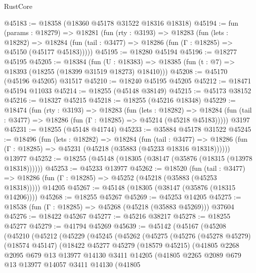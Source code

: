 \begin{lexlean}{RustCore}
\begin{coremodule}
@45183 := @18358 (@18360 @45178 @31522 @18316 @18318)
@45194 := fun (params : @18279) =>
  @18281
    (fun (rty : @3193) =>
    @18283
      (fun (lets : @18282) =>
      @18284 (fun (tail : @3477) => @18286 (fun (Γ : @18285) => @45150 (@45177 @45183)))))
@45195 := @18280 @45194
@45196 := @18277 @45195
@45205 := @18384
    (fun (U : @18383) => @18385 (fun (t : @7) => @18393 (@18255 (@18399 @31519 @18273) @18410)))
@45208 := @45170 (@45196 @45205) @31517
@45210 := @18240 @45195 @45205
@45212 := @18471 @45194 @11033
@45214 := @18255 (@45148 @38149)
@45215 := @45173 @38152
@45216 := @18327 @45215
@45218 := @18255 (@45216 @18348)
@45229 := @18474
    (fun (rty : @3193) =>
    @18283
      (fun (lets : @18282) =>
      @18284 (fun (tail : @3477) => @18286 (fun (Γ : @18285) => @45214 (@45218 @45183)))))
    @3197
@45231 := @18255 (@45148 @41744)
@45233 := @35884 @45178 @31522
@45245 := @18496
    (fun (lets : @18282) =>
    @18284
      (fun (tail : @3477) =>
      @18286 (fun (Γ : @18285) => @45231 (@45218 (@35883 (@45233 @18316 @18318))))))
    @13977
@45252 := @18255 (@45148 (@18305 (@38147 (@35876 (@18315 (@13978 @18318))))))
@45253 := @45233 @13977
@45262 := @18520
    (fun (tail : @3477) => @18286 (fun (Γ : @18285) => @45252 (@45218 (@35883 (@45253 @18318)))))
    @14205
@45267 := @45148 (@18305 (@38147 (@35876 (@18315 @14206))))
@45268 := @18255 @45267
@45269 := @45253 @14205
@45275 := @18538 (fun (Γ : @18285) => @45268 (@45218 (@35883 @45269))) @37604
@45276 := @18422 @45267
@45277 := @45216 @38217
@45278 := @18255 @45277
@45279 := @41794 @45269
@45639 := @45142
    (@45167
      (@45208
        (@45210
          (@45212
            (@45229
              (@45245
                (@45262
                  (@45275
                    (@45276
                      (@45278 @45279)
                      (@18574 @45147)
                      (@18422
                        @45277
                        @45279
                        (@18579 @45215)
                        (@41805
                          @2268
                          @2095
                          @679
                          @13
                          @13977
                          @14130
                          @3411
                          @14205
                          (@41805
                            @2265
                            @2089
                            @679
                            @13
                            @13977
                            @14057
                            @3411
                            @14130
                            (@41805

\end{coremodule}
\end{lexlean}

